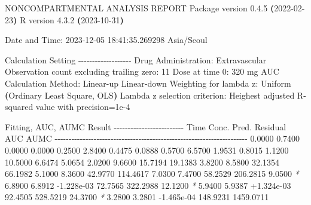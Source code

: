 \documentclass[
  11pt,
  krantz2, a4paper, twoside]{krantz}
\newenvironment{Shaded}{\begin{snugshade}}{\end{snugshade}}
\newcommand{\AttributeTok}[1]{\textcolor[rgb]{0.13,0.29,0.53}{#1}}
\newcommand{\ErrorTok}[1]{\textcolor[rgb]{0.64,0.00,0.00}{\textbf{#1}}}
\newcommand{\ExtensionTok}[1]{#1}
\newcommand{\KeywordTok}[1]{\textcolor[rgb]{0.13,0.29,0.53}{\textbf{#1}}}
\newcommand{\NormalTok}[1]{#1}
\newcommand{\PreprocessorTok}[1]{\textcolor[rgb]{0.56,0.35,0.01}{\textit{#1}}}
\theoremstyle{definition}
\theoremstyle{definition}
\theoremstyle{definition}
\theoremstyle{definition}
\theoremstyle{remark}
\begin{document}
\begin{Shaded}
\begin{Highlighting}[]
                        \ExtensionTok{NONCOMPARTMENTAL}\NormalTok{ ANALYSIS REPORT}
                       \ExtensionTok{Package}\NormalTok{ version 0.4.5 }\ErrorTok{(}\ExtensionTok{2022{-}02{-}23}\KeywordTok{)}
                          \ExtensionTok{R}\NormalTok{ version 4.3.2 }\ErrorTok{(}\ExtensionTok{2023{-}10{-}31}\KeywordTok{)}

\ExtensionTok{Date}\NormalTok{ and Time: 2023{-}12{-}05 18:41:35.269298 Asia/Seoul}

\ExtensionTok{Calculation}\NormalTok{ Setting}
\ExtensionTok{{-}{-}{-}{-}{-}{-}{-}{-}{-}{-}{-}{-}{-}{-}{-}{-}{-}{-}{-}}
\ExtensionTok{Drug}\NormalTok{ Administration: Extravascular}
\ExtensionTok{Observation}\NormalTok{ count excluding trailing zero: 11}
\ExtensionTok{Dose}\NormalTok{ at time 0: 320 mg}
\ExtensionTok{AUC}\NormalTok{ Calculation Method: Linear{-}up Linear{-}down}
\ExtensionTok{Weighting}\NormalTok{ for lambda z: Uniform }\ErrorTok{(}\ExtensionTok{Ordinary}\NormalTok{ Least Square, OLS}\KeywordTok{)}
\ExtensionTok{Lambda}\NormalTok{ z selection criterion: Heighest adjusted R{-}squared value with precision=1e{-}4}


\ExtensionTok{Fitting,}\NormalTok{ AUC, AUMC Result}
\ExtensionTok{{-}{-}{-}{-}{-}{-}{-}{-}{-}{-}{-}{-}{-}{-}{-}{-}{-}{-}{-}{-}{-}{-}{-}{-}{-}}
      \ExtensionTok{Time}\NormalTok{         Conc.      Pred.   Residual       AUC       AUMC}
\ExtensionTok{{-}{-}{-}{-}{-}{-}{-}{-}{-}{-}{-}{-}{-}{-}{-}{-}{-}{-}{-}{-}{-}{-}{-}{-}{-}{-}{-}{-}{-}{-}{-}{-}{-}{-}{-}{-}{-}{-}{-}{-}{-}{-}{-}{-}{-}{-}{-}{-}{-}{-}{-}{-}{-}{-}{-}{-}{-}{-}{-}{-}{-}{-}{-}{-}{-}{-}{-}{-}{-}}
     \ExtensionTok{0.0000}\NormalTok{       0.7400                           0.0000     0.0000}
     \ExtensionTok{0.2500}\NormalTok{       2.8400                           0.4475     0.0888}
     \ExtensionTok{0.5700}\NormalTok{       6.5700                           1.9531     0.8015}
     \ExtensionTok{1.1200}\NormalTok{      10.5000                           6.6474     5.0654}
     \ExtensionTok{2.0200}\NormalTok{       9.6600                          15.7194    19.1383}
     \ExtensionTok{3.8200}\NormalTok{       8.5800                          32.1354    66.1982}
     \ExtensionTok{5.1000}\NormalTok{       8.3600                          42.9770   114.4617}
     \ExtensionTok{7.0300}\NormalTok{       7.4700                          58.2529   206.2815}
     \ExtensionTok{9.0500} \PreprocessorTok{*}\NormalTok{     6.8900     6.8912 }\AttributeTok{{-}1.228e{-}03}\NormalTok{    72.7565   322.2988}
    \ExtensionTok{12.1200} \PreprocessorTok{*}\NormalTok{     5.9400     5.9387 +1.324e{-}03    92.4505   528.5219}
    \ExtensionTok{24.3700} \PreprocessorTok{*}\NormalTok{     3.2800     3.2801 }\AttributeTok{{-}1.465e{-}04}\NormalTok{   148.9231  1459.0711}


\end{Highlighting}
\end{Shaded}
\end{document}

